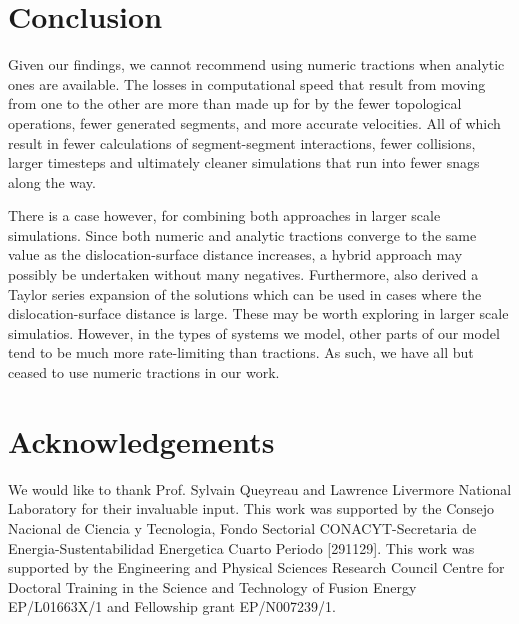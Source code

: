 \documentclass[11pt]{iopart}
\begin{document}
\section{Conclusion}

Given our findings, we cannot recommend using numeric tractions when analytic ones are available. The losses in computational speed that result from moving from one to the other are more than made up for by the fewer topological operations, fewer generated segments, and more accurate velocities. All of which result in fewer calculations of segment-segment interactions, fewer collisions, larger timesteps and ultimately cleaner simulations that run into fewer snags along the way.

There is a case however, for combining both approaches in larger scale simulations. Since both numeric and analytic tractions converge to the same value as the dislocation-surface distance increases, a hybrid approach may possibly be undertaken without many negatives. Furthermore, \cite{Queyreau} also derived a Taylor series expansion of the solutions which can be used in cases where the dislocation-surface distance is large. These may be worth exploring in larger scale simulatios. However, in the types of systems we model, other parts of our model tend to be much more rate-limiting than tractions. As such, we have all but ceased to use numeric tractions in our work.

\section{Acknowledgements}

We would like to thank Prof. Sylvain Queyreau and Lawrence Livermore National Laboratory for their invaluable input. This work was supported by the Consejo Nacional de Ciencia y Tecnologia, Fondo Sectorial CONACYT-Secretaria de Energia-Sustentabilidad Energetica Cuarto Periodo [291129]. This work was supported by the Engineering and Physical Sciences Research Council Centre for Doctoral Training in the Science and Technology of Fusion Energy EP/L01663X/1 and Fellowship grant EP/N007239/1.

\newcommand{\newblock}{}








\end{document}
